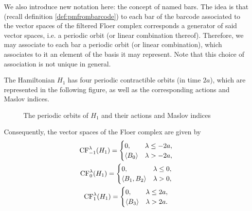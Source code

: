 We also introduce new notation here: the concept of named bars. The idea is that (recall definition \ref{def:pmfrombarcode}) to each bar of the barcode associated to the vector spaces of the filtered Floer complex corresponds a generator of said vector spaces, i.e. a periodic orbit (or linear combination thereof). Therefore, we may associate to each bar a periodic orbit (or linear combination), which associates to it an element of the basis it may represent. Note that this choice of association is not unique in general.

\begin{prop}
The Hamiltonian $H_1$ has four periodic contractible orbits (in time $2a$), which are represented in the following figure, as well as the corresponding actions and Maslov indices.
\begin{figure}[H]
\centering
{}
\caption{The periodic orbits of $H_1$ and their actions and Maslov indices}
\label{orbitsh1}
\end{figure}

Consequently, the vector spaces of the Floer complex are given by
\begin{equation}
\begin{gathered}
\mathrm{CF}_{-1}^\lambda(H_1) = \begin{cases}
0, & \lambda \leq -2a,\\
\langle B_0\rangle & \lambda > -2a,
\end{cases}
\\
\mathrm{CF}_{0}^\lambda(H_1) = \begin{cases}
0, & \lambda \leq 0,\\
\langle B_1,B_2\rangle & \lambda > 0,
\end{cases}
\\
\mathrm{CF}_{1}^\lambda(H_1) = \begin{cases}
0, & \lambda \leq 2a,\\
\langle B_3\rangle & \lambda  > 2a.
\end{cases}
\end{gathered}
\end{equation}


\end{prop}
